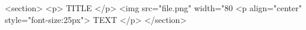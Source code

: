 <section>
    <p> TITLE </p> 
        <img src="file.png" width="80%
        <p align="center" style="font-size:25px">  
            TEXT        
        </p>
</section>

